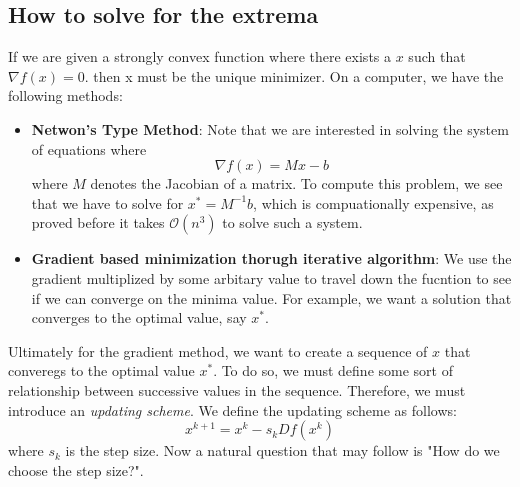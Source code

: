 \documentclass[11pt]{article}
\theoremstyle{definition}
\begin{document}
\subsection{How to solve for the extrema}
If we are given a strongly convex function where there exists a $x$ such that $\nabla f(x) = 0$. then x must be the unique minimizer. On a computer, we have the following methods:
\begin{itemize}
  \item \textbf{Netwon's Type Method}: Note that we are interested in solving the system of equations where \[
  \nabla f(x) = Mx - b
  \]
  where $M$ denotes the Jacobian of a matrix. To compute this problem, we see that we have to solve for $x^* = M^{-1}b$, which is compuationally expensive, as proved before it takes $\mathcal{O}(n^3)$ to solve such a system. 
  \item \textbf{Gradient based minimization thorugh iterative algorithm}: We use the gradient multiplized by some arbitary value to travel down the fucntion to see if we can converge on the minima value. For example, we want a solution that converges to the optimal value, say $x^*$. 
\end{itemize}
Ultimately for the gradient method, we want to create a sequence of $x$ that converegs to the optimal value $x^*$. To do so, we must define some sort of relationship between successive values in the sequence. Therefore, we must introduce an \emph{updating scheme}. We define the updating scheme as follows:
\[
x^{k+1} = x^k - s_k Df(x^k)
\]
where $s_k$ is the step size. Now a natural question that may follow is "How do we choose the step size?". 
\end{document}
